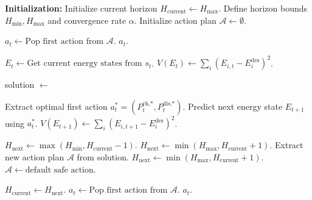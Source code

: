 \begin{algorithm}[H]
\caption{Lyapunov-based Adaptive Horizon MPC}
\label{alg:lyapunov_mpc}
\begin{algorithmic}[1]
\State \textbf{Initialization:}
\State Initialize current horizon $H_{\text{current}} \leftarrow H_{\text{max}}$.
\State Define horizon bounds $H_{\text{min}}, H_{\text{max}}$ and convergence rate $\alpha$.
\State Initialize action plan $\mathcal{A} \leftarrow \emptyset$.

        \State $a_t \leftarrow \text{Pop first action from } \mathcal{A}$.
        \State \Return $a_t$.
    \EndIf
    
    \State {}
    \State $E_t \leftarrow \text{Get current energy states from } s_t$.
    \State $V(E_t) \leftarrow \sum_{i} (E_{i,t} - E_i^{\text{des}})^2$.
    
    \State {}
    \State solution $\leftarrow$  
    
        \State Extract optimal first action $a_t^* = (P^{\text{ch,*}}_{t}, P^{\text{dis,*}}_{t})$.
        \State Predict next energy state $E_{t+1}$ using $a_t^*$.
        \State $V(E_{t+1}) \leftarrow \sum_{i} (E_{i,t+1} - E_i^{\text{des}})^2$.
        
        \State {}
            \State {}
            \State $H_{\text{next}} \leftarrow \max(H_{\text{min}}, H_{\text{current}} - 1)$.
        \Else
            \State {}
            \State $H_{\text{next}} \leftarrow \min(H_{\text{max}}, H_{\text{current}} + 1)$.
        \EndIf
        \State Extract new action plan $\mathcal{A}$ from solution.
    \Else
        \State {}
        \State $H_{\text{next}} \leftarrow \min(H_{\text{max}}, H_{\text{current}} + 1)$.
        \State $\mathcal{A} \leftarrow \text{default safe action}$.
    \EndIf
    
    \State $H_{\text{current}} \leftarrow H_{\text{next}}$.
    \State $a_t \leftarrow \text{Pop first action from } \mathcal{A}$.
    \State \Return $a_t$.
\EndFunction
\end{algorithmic}
\end{algorithm}
